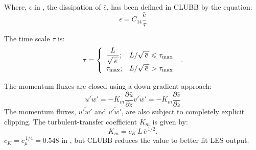 \documentclass[11pt,fleqn]{article}
\newcommand{\ptlder}[2]{\frac{\partial #1}{\partial #2}}
\begin{document}
Where, $\epsilon$ in \citet{bougeault1981b}, the dissipation of $\bar{e}$, has been defined in CLUBB by the equation:
\begin{equation}
\epsilon = C_{14} \frac{\bar{e}}{\tau}
\end{equation}

The time scale $\tau$ is:
%
\begin{equation}
\label{eq_tau}
\tau = \left\{
\begin{array}{ll}
\displaystyle \frac{L}{\sqrt{\, \overline{e} \,}}; 
& L / \sqrt{\, \overline{e} \,} \leqslant \tau_{\rm max} \\
\displaystyle \tau_{\rm max};
&  L / \sqrt{\, \overline{e} \,} > \tau_{\rm max}
\end{array}
\right. \hbox{ .}
\end{equation}
%

The momentum fluxes are closed using a down gradient approach:
%
\begin{subequations}
\begin{equation}
\label{eq_upwp}
\overline{u'w'} = -K_m \ptlder{\bar{u}}{z}
\end{equation}
%
\begin{equation}
\label{eq_vpwp}
\overline{v'w'} = -K_m \ptlder{\bar{v}}{z}
\end{equation}
\end{subequations}
%
The momentum fluxes, $\overline{u'w'}$ and $\overline{v'w'}$, are also subject 
to completely explicit clipping.  The turbulent-transfer coefficient $K_m$ is 
given by:
%
\begin{equation}
\label{eq_Km}
K_m = c_K \, L \, \overline{e}^{\, 1/2} .
\end{equation}
%
$c_K = c_{\mu}^{\, 1/4} = 0.548$ in \citet{duynkerke1987a}, but CLUBB reduces the value to better fit LES output.

\end{document}
